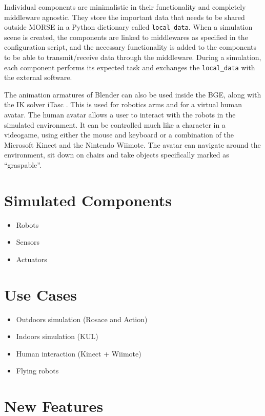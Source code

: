 \documentclass{llncs}
\begin{document}
Individual components are minimalistic in their functionality and  completely middleware agnostic. They store the important data that needs to be shared outside MORSE in a Python dictionary called \texttt{local\_data}.
When a simulation scene is created, the components are linked to middlewares as specified in the configuration script, and the necessary functionality is added to the components to be able to transmit/receive data through the middleware.
During a simulation, each component performs its expected task and exchanges the \texttt{local\_data} with the external software.



The animation armatures of Blender can also be used inside the BGE, along with the IK solver iTasc \cite{iTaSC}. This is used for robotics arms and for a virtual human avatar.
The human avatar allows a user to interact with the robots in the simulated environment. It can be controlled much like a character in a videogame, using either the mouse and keyboard or a combination of the Microsoft Kinect and the Nintendo Wiimote. The avatar can navigate around the environment, sit down on chairs and take objects specifically marked as ``graspable''.

\section{Simulated Components}
\label{section:components}

\begin{itemize}
  \item Robots
  \item Sensors
  \item Actuators
\end{itemize}


\section{Use Cases}

\begin{itemize}
  \item Outdoors simulation (Rosace and Action)
  \item Indoors simulation (KUL)
  \item Human interaction (Kinect + Wiimote)
  \item Flying robots
\end{itemize}


\section{New Features}
\end{document}
